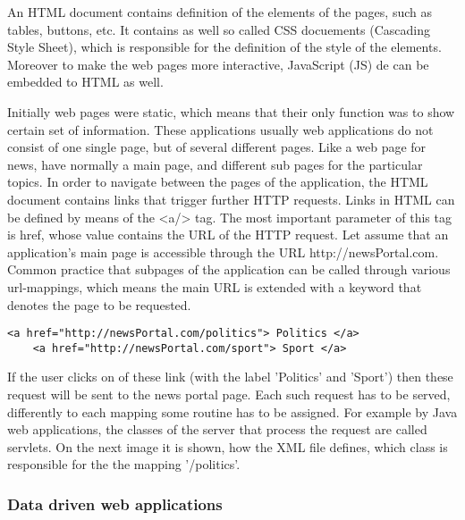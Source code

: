 

An HTML document contains definition of the elements of the pages, such as tables, buttons, etc. It contains as well so called CSS docuements (Cascading Style Sheet), which is responsible for the definition of the style of the elements. Moreover to make the web pages more interactive, JavaScript (JS) de can be embedded to HTML as well. 


Initially web pages were static, which means that their only function was to show certain set of information. These applications usually web applications do not consist of one single page, but of several different pages. Like a web page for news, have normally a main page, and different sub pages for the particular topics. In order to navigate between the pages of the application, the HTML document contains links that trigger further HTTP requests. Links in HTML can be defined by means of the <a/> tag.  The most important parameter of this tag is href, whose value contains the URL of the HTTP request. Let assume that an application’s main page is accessible through the URL http://newsPortal.com. Common practice that subpages of the application can be called through various url-mappings, which means the main URL is extended with a keyword that denotes the page to be requested. 

\begin{lstlisting}[captionpos=b, caption=Example link definitions, label=skullJSON, belowskip=1em, aboveskip=2em,
basicstyle=\footnotesize,frame=single]
	<a href="http://newsPortal.com/politics"> Politics </a>
	<a href="http://newsPortal.com/sport"> Sport </a>
\end{lstlisting}

If the user clicks on of these link (with the label 'Politics' and 'Sport') then these request will be sent to the news portal page. Each such request has to be served, differently to each mapping some routine has to be assigned. For example by Java web applications, the classes of the server that process the request are called servlets. On the next image it is shown, how the XML file defines, which class is responsible for the the mapping '/politics'.


\subsubsection{Data driven web applications} \label{dataDriven}


